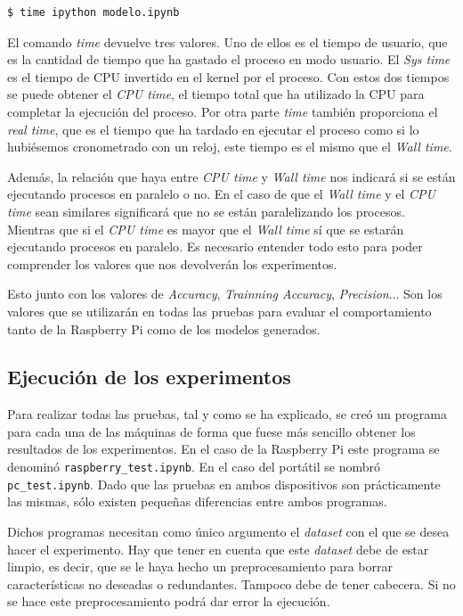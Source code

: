 \documentclass[a4paper, 12pt]{book}
\begin{document}
\begin{lstlisting}[language=bash]
  $ time ipython modelo.ipynb
\end{lstlisting}

El comando \textit{time} devuelve tres valores. Uno de ellos es el tiempo de usuario, que es la cantidad de tiempo que ha gastado el proceso en modo usuario. El \textit{Sys time} es el tiempo de CPU invertido en el kernel por el proceso. Con estos dos tiempos se puede obtener el \textit{CPU time}, el tiempo total que ha utilizado la CPU para completar la ejecución del proceso. Por otra parte \textit{time} también proporciona el \textit{real time}, que es el tiempo que ha tardado en ejecutar el proceso como si lo hubiésemos cronometrado con un reloj, este tiempo es el mismo que el \textit{Wall time}. 

Además, la relación que haya entre \textit{CPU time} y \textit{Wall time} nos indicará si se están ejecutando procesos en paralelo o no. En el caso de que el \textit{Wall time} y el \textit{CPU time} sean similares significará que no se están paralelizando los procesos. Mientras que si el \textit{CPU time} es mayor que el \textit{Wall time} sí que se estarán ejecutando procesos en paralelo\cite{timeDoc}. Es necesario entender todo esto para poder comprender los valores que nos devolverán los experimentos.

Esto junto con los valores de \textit{Accuracy}, \textit{Trainning Accuracy}, \textit{Precision}... Son los valores que se utilizarán en todas las pruebas para evaluar el comportamiento tanto de la Raspberry Pi como de los modelos generados.

\subsection{Ejecución de los experimentos}
\label{subsec:ejecucion_experimentos}

Para realizar todas las pruebas, tal y como se ha explicado, se creó un programa para cada una de las máquinas de forma que fuese más sencillo obtener los resultados de los experimentos. En el caso de la Raspberry Pi este programa se denominó \texttt{raspberry\_test.ipynb}. En el caso del portátil se nombró \texttt{pc\_test.ipynb}. Dado que las pruebas en ambos dispositivos son prácticamente las mismas, sólo existen pequeñas diferencias entre ambos programas.

Dichos programas necesitan como único argumento el \textit{dataset} con el que se desea hacer el experimento.
Hay que tener en cuenta que este \textit{dataset} debe de estar limpio, es decir, que se le haya hecho un preprocesamiento para borrar características no deseadas o redundantes. Tampoco debe de tener cabecera. Si no se hace este preprocesamiento podrá dar error la ejecución.
\end{document}
